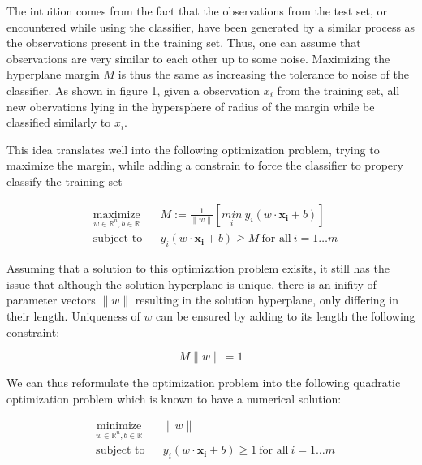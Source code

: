 The intuition comes from the fact that the observations from the test set, or encountered while using the classifier, have been generated by a similar process as the observations present in the training set. Thus, one can assume that observations are very similar to each other up to some noise. Maximizing the hyperplane margin
$M$ is thus the same as increasing the tolerance to noise of the classifier. As shown in figure 1, given a observation $x_i$ from the training set, all new obervations lying in the hypersphere of radius of the margin while be classified similarly to $x_i$.


This idea translates well into the following optimization problem, trying to maximize the margin, while adding a constrain to force the classifier to propery classify the training set

\begin{equation}
  \begin{aligned}
    &\underset{w \in \mathbb{R}^n, b \in \mathbb{R}} {\text{maximize}}
    & & M := \frac{1}{\|w\|} \left[\underset{i} {min}\ 
    y_i(w \cdot \mathbf{x_i} + b)\right]\\
    &\text{subject to}
    & &y_i(w \cdot \mathbf{x_i} + b) \ge M\ \text{for all}\ i = 1 \dotsc m
  \end{aligned}
\end{equation}

Assuming that a solution to this optimization problem exisits, it still has the issue that although the solution hyperplane is unique, there is an inifity of parameter vectors $\|w\|$ resulting in the solution hyperplane, only differing in their length. Uniqueness of $w$ can be ensured by adding to its length the following constraint:

$$M\|w\| = 1$$

We can thus reformulate the optimization problem into the following quadratic optimization problem which is known to have a numerical solution:

\begin{equation}
  \begin{aligned}
    &\underset{w \in \mathbb{R}^n, b \in \mathbb{R}} {\text{minimize}}
    & &\|w\|\\
    &\text{subject to}
    & &y_i(w \cdot \mathbf{x_i} + b) \ge 1\ \text{for all}\ i = 1 \dotsc m
  \end{aligned}
\end{equation}


